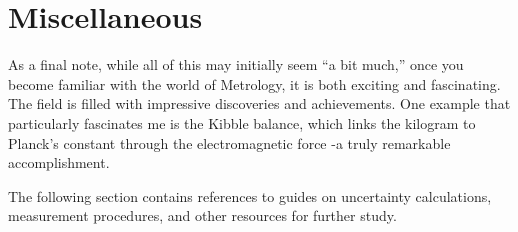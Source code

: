 \documentclass[12pt,a4paper]{article}
\begin{document}
\section{Miscellaneous}
As a final note, while all of this may initially seem “a bit much,” once you become familiar with the world of Metrology, it is both exciting and fascinating. The field is filled with impressive discoveries and achievements. One example that particularly fascinates me is the Kibble balance, which links the kilogram to Planck's constant through the electromagnetic force -a truly remarkable accomplishment.

The following section contains references to guides on uncertainty calculations, measurement procedures, and other resources for further study.
\end{document}
